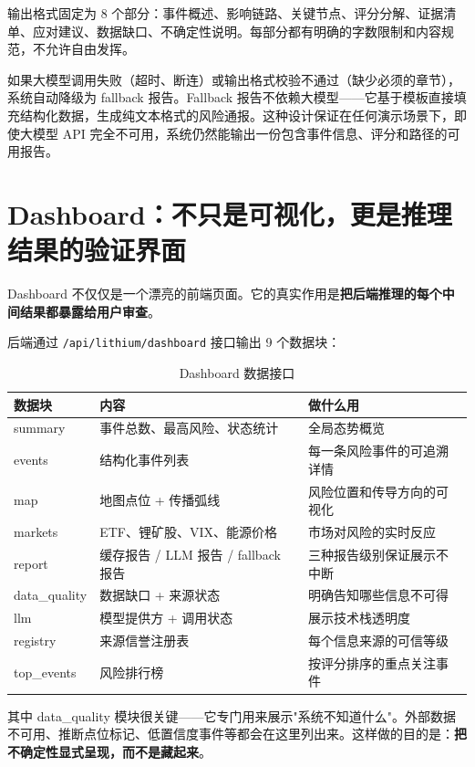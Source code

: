 \documentclass[12pt,a4paper]{ctexart}
\begin{document}
输出格式固定为 8 个部分：事件概述、影响链路、关键节点、评分分解、证据清单、应对建议、数据缺口、不确定性说明。每部分都有明确的字数限制和内容规范，不允许自由发挥。

如果大模型调用失败（超时、断连）或输出格式校验不通过（缺少必须的章节），系统自动降级为 fallback 报告。Fallback 报告不依赖大模型——它基于模板直接填充结构化数据，生成纯文本格式的风险通报。这种设计保证在任何演示场景下，即使大模型 API 完全不可用，系统仍然能输出一份包含事件信息、评分和路径的可用报告。

\section{Dashboard：不只是可视化，更是推理结果的验证界面}

Dashboard 不仅仅是一个漂亮的前端页面。它的真实作用是\textbf{把后端推理的每个中间结果都暴露给用户审查}。

后端通过 \texttt{/api/lithium/dashboard} 接口输出 9 个数据块：

\begin{table}[htbp]
\centering
\caption{Dashboard 数据接口}
\begin{tabularx}{\textwidth}{p{2.5cm}p{5.6cm}X}
\toprule
数据块 & 内容 & 做什么用 \\
\midrule
summary & 事件总数、最高风险、状态统计 & 全局态势概览 \\
events & 结构化事件列表 & 每一条风险事件的可追溯详情 \\
map & 地图点位 + 传播弧线 & 风险位置和传导方向的可视化 \\
markets & ETF、锂矿股、VIX、能源价格 & 市场对风险的实时反应 \\
report & 缓存报告 / LLM 报告 / fallback 报告 & 三种报告级别保证展示不中断 \\
data\_quality & 数据缺口 + 来源状态 & 明确告知哪些信息不可得 \\
llm & 模型提供方 + 调用状态 & 展示技术栈透明度 \\
registry & 来源信誉注册表 & 每个信息来源的可信等级 \\
top\_events & 风险排行榜 & 按评分排序的重点关注事件 \\
\bottomrule
\end{tabularx}
\end{table}

其中 data\_quality 模块很关键——它专门用来展示"系统不知道什么"。外部数据不可用、推断点位标记、低置信度事件等都会在这里列出来。这样做的目的是：\textbf{把不确定性显式呈现，而不是藏起来}。
\end{document}
